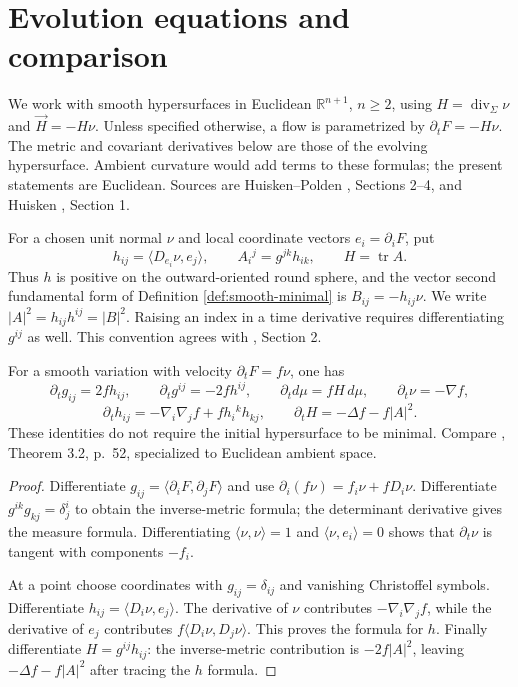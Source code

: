 \chapter{Evolution equations and comparison}\label{sec:mcf-evolution}
We work with smooth hypersurfaces in Euclidean $\mathbb R^{n+1}$, $n\geq2$, using $H=\operatorname{div}_\Sigma\nu$ and $\vec H=-H\nu$. Unless specified otherwise, a flow is parametrized by $\partial_tF=-H\nu$. The metric and covariant derivatives below are those of the evolving hypersurface. Ambient curvature would add terms to these formulas; the present statements are Euclidean. Sources are Huisken--Polden \cite{HP99}, Sections 2--4, and Huisken \cite{Hui90}, Section 1.

\begin{definition}\label{def:mcf-scalar-second-form}
For a chosen unit normal $\nu$ and local coordinate vectors $e_i=\partial_iF$, put
\[
 h_{ij}=\langle D_{e_i}\nu,e_j\rangle,
 \qquad A_i{}^j=g^{jk}h_{ik},\qquad H=\operatorname{tr}A.
\]
Thus $h$ is positive on the outward-oriented round sphere, and the vector second fundamental form of Definition \ref{def:smooth-minimal} is $B_{ij}=-h_{ij}\nu$. We write $|A|^2=h_{ij}h^{ij}=|B|^2$. Raising an index in a time derivative requires differentiating $g^{ij}$ as well. This convention agrees with \cite{HP99}, Section 2.
\end{definition}

\begin{proposition}\label{prop:normal-variation-formulas}
For a smooth variation with velocity $\partial_tF=f\nu$, one has
\[
 \partial_tg_{ij}=2fh_{ij},\qquad
 \partial_tg^{ij}=-2fh^{ij},\qquad
 \partial_t d\mu=fH\,d\mu,\qquad \partial_t\nu=-\nabla f,
\]
\[
 \partial_th_{ij}=-\nabla_i\nabla_jf+fh_i{}^kh_{kj},
 \qquad \partial_tH=-\Delta f-f|A|^2.
\]
These identities do not require the initial hypersurface to be minimal. Compare \cite{HP99}, Theorem 3.2, p.~52, specialized to Euclidean ambient space.
\end{proposition}
\begin{proof}
Differentiate $g_{ij}=\langle\partial_iF,\partial_jF\rangle$ and use $\partial_i(f\nu)=f_i\nu+fD_i\nu$. Differentiate $g^{ik}g_{kj}=\delta^i_j$ to obtain the inverse-metric formula; the determinant derivative gives the measure formula. Differentiating $\langle\nu,\nu\rangle=1$ and $\langle\nu,e_i\rangle=0$ shows that $\partial_t\nu$ is tangent with components $-f_i$.

At a point choose coordinates with $g_{ij}=\delta_{ij}$ and vanishing Christoffel symbols. Differentiate $h_{ij}=\langle D_i\nu,e_j\rangle$. The derivative of $\nu$ contributes $-\nabla_i\nabla_j f$, while the derivative of $e_j$ contributes $f\langle D_i\nu,D_j\nu\rangle$. This proves the formula for $h$. Finally differentiate $H=g^{ij}h_{ij}$: the inverse-metric contribution is $-2f|A|^2$, leaving $-\Delta f-f|A|^2$ after tracing the $h$ formula.
\end{proof}

